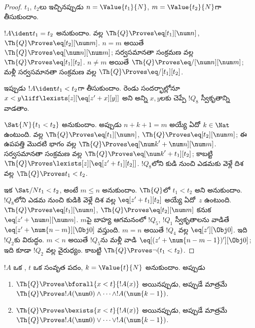 \documentclass[../../../include/open-logic-section]{subfiles}
\begin{document}
\begin{proof}
$t_1$, $t_2$లు ఇచ్చినప్పుడు $n=\Value{t_1}{N}$,
$m=\Value{t_2}{N}$గా తీసుకుందాం.

$!A\ident t_1=t_2$ అనుకుందాం.  వల్ల
$\Th{Q}\Proves\eq[t_1][\num n]$, $\Th{Q}\Proves\eq[t_2][\num m]$.
$n=m$ అయితే $\Th{Q}\Proves\eq[\num n][\num m]$; సర్వసమానతా సంక్రమణ
వల్ల $\Th{Q}\Proves\eq[t_1][t_2]$. $n\neq m$ అయితే
$\Th{Q}\Proves\eq/[\num n][\num m]$; మళ్లీ సర్వసమానతా సంక్రమణ వల్ల
$\Th{Q}\Proves\eq/[t_1][t_2]$.

ఇప్పుడు $!A\ident t_1<t_2$గా తీసుకుందాం. రెండు సందర్భాల్లోనూ
$x<y\liff\lexists[z][\eq[z'+x][y]]$ అని అన్ని $x,y$లకు చెప్పే $!Q_8$
స్వీకృతాన్ని వాడతాం.

$\Sat{N}{t_1<t_2}$ అనుకుందాం. అప్పుడు $n+k+1=m$ అయ్యే ఏదో $k\in\Nat$
ఉంటుంది.  వల్ల
$\Th{Q}\Proves\eq[t_1][\num n]$, $\Th{Q}\Proves\eq[t_2][\num m]$;
ఈ ఉపపత్తి మొదటి భాగం వల్ల
$\Th{Q}\Proves\eq[{\num k}'+\num n][\num m]$. సర్వసమానతా సంక్రమణ వల్ల
$\Th{Q}\Proves\eq[{\num k}'+t_1][t_2]$; కాబట్టి
$\Th{Q}\Proves\lexists[z][\eq[z'+t_1][t_2]]$. $!Q_8$లోని కుడి నుంచి ఎడమకు వెళ్లే
దిశ వల్ల $\Th{Q}\Proves t_1<t_2$.

ఇక $\Sat/{N}{t_1<t_2}$, అంటే $m\leq n$ అనుకుందాం.
%
$\Th{Q}$లో $t_1<t_2$ అని అనుకుందాం. $!Q_8$లోని
ఎడమ నుంచి కుడికి వెళ్లే దిశ వల్ల $\eq[z'+t_1][t_2]$ అయ్యే ఏదో~$z$ ఉంటుంది.
$\Th{Q}\Proves\eq[t_1][\num n]$, $\Th{Q}\Proves\eq[t_2][\num m]$ కనుక
$\eq[z'+\num n][\num m]$.
%
$m$పై బాహ్య ఆగమనంలో $!Q_5$, $!Q_1$ స్వీకృతాలను వాడితే
$\eq[z'+\num{n-m}][\Obj 0]$ వస్తుంది. $m=n$ అయితే $!Q_4$ వల్ల
$\eq[z'][\Obj 0]$. ఇది $!Q_2$కు విరుద్ధం. $m<n$ అయితే $!Q_5$ను మళ్లీ వాడి
$\eq[(z'+\num{n-m-1})'][\Obj 0]$; ఇది కూడా $!Q_2$ వల్ల వైరుధ్యం. కాబట్టి
$\Th{Q}\Proves\lnot(t_1<t_2)$.
\end{proof}

\begin{lem}
$!A$ ఒక , $t$ ఒక సంవృత పదం, $k=\Value{t}{N}$ అనుకుందాం.
అప్పుడు
\begin{enumerate}
\item $\Th{Q}\Proves\bforall{x<t}{!A(x)}$ అయినప్పుడు, అప్పుడే మాత్రమే
    $\Th{Q}\Proves !A(\num0)\land\dots\land !A(\num{k-1})$.
\item $\Th{Q}\Proves\bexists{x<t}{!A(x)}$ అయినప్పుడు, అప్పుడే మాత్రమే
    $\Th{Q}\Proves !A(\num0)\lor\dots\lor !A(\num{k-1})$.
\end{enumerate}
\end{lem}
\end{document}
